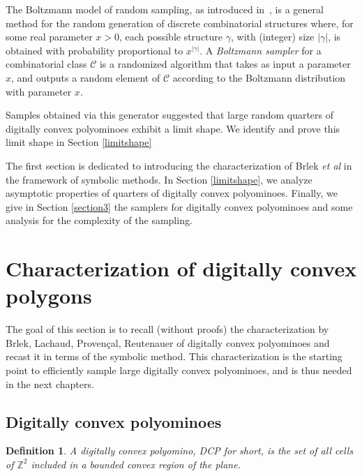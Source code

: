 \documentclass{article}
\newtheorem{definition}[theorem]{Definition}
\begin{document}
The Boltzmann model of random sampling, as introduced
in~\cite{DuFlLoSc04}, is a general method for the random generation of
discrete combinatorial structures where, for some real parameter
$x>0$, each possible structure $\gamma$, with (integer) size
$|\gamma|$, is obtained with probability proportional to
$x^{|\gamma|}$.
A \emph{Boltzmann sampler} for a
combinatorial class $\mathcal{C}$ is a randomized algorithm that takes
as input a parameter $x$, and outputs a random element of
$\mathcal{C}$ according to the Boltzmann distribution with parameter $x$.










Samples obtained via this generator suggested that large random quarters of digitally convex polyominoes exhibit a limit shape. 
We identify and prove this limit shape in Section \ref{limitshape}


The first
section is dedicated to introducing the characterization of Brlek
\emph{et al} \cite{Brlek09a} in the framework of symbolic methods. In Section \ref{limitshape},
we analyze asymptotic properties of quarters of digitally convex polyominoes. Finally, we give 
 in Section \ref{section3} the samplers for digitally convex polyominoes and
some analysis for the complexity of the sampling. 




\section{Characterization of digitally convex polygons}
The goal of this section is to recall (without proofs) the characterization by Brlek, Lachaud,
Proven\c{c}al, Reutenauer \cite{Brlek09a} of digitally convex
polyominoes and recast it in terms of the symbolic method. This characterization is the starting point to
efficiently sample large digitally convex polyominoes,
and is thus needed in the next chapters. 



\subsection{Digitally convex polyominoes}
\begin{definition}
A \emph{digitally convex polyomino}, DCP for short, is the set of all cells of $\mathbb{Z}^2$
included in a bounded convex region of the plane.
\end{definition}
\end{document}
